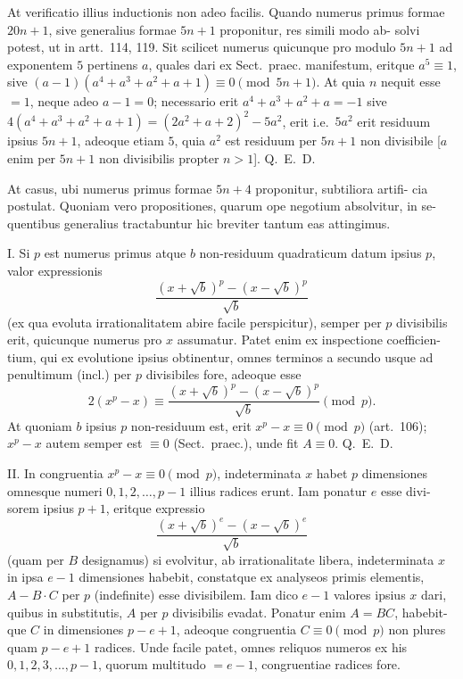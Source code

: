 \documentclass[12pt,a4paper]{article}
\begin{document}
At verificatio illius inductionis non adeo facilis. Quando numerus primus
formae $20n+1$, sive generalius formae $5n+1$ proponitur, res simili modo ab-
solvi potest, ut in artt.~114, 119. Sit scilicet numerus quicunque pro modulo
$5n+1$ ad exponentem $5$ pertinens $a$, quales dari ex Sect.~praec. manifestum,
eritque $a^5 \equiv 1$, sive $(a-1)(a^4+a^3+a^2+a+1) \equiv 0 \pmod{5n+1}$. At quia
$n$ nequit esse $=1$, neque adeo $a-1=0$; necessario erit $a^4+a^3+a^2+a = -1$
sive $4(a^4+a^3+a^2+a+1) = (2a^2+a+2)^2 - 5a^2$, erit
i.e.\ $5a^2$ erit residuum ipsius $5n+1$, adeoque etiam $5$, quia $a^2$ est residuum
per $5n+1$ non divisibile [$a$ enim per $5n+1$ non divisibilis propter $n > 1$].
Q.~E.~D.

At casus, ubi numerus primus formae $5n+4$ proponitur, subtiliora artifi-
cia postulat. Quoniam vero propositiones, quarum ope negotium absolvitur, in se-
quentibus generalius tractabuntur hic breviter tantum eas attingimus.

I. Si $p$ est numerus primus atque $b$ non-residuum quadraticum datum
ipsius $p$, valor expressionis
\[
\frac{(x+\sqrt{b})^p - (x-\sqrt{b})^p}{\sqrt{b}}
\]
(ex qua evoluta irrationalitatem abire facile perspicitur), semper per $p$ divisibilis
erit, quicunque numerus pro $x$ assumatur. Patet enim ex inspectione coefficien-
tium, qui ex evolutione ipsius obtinentur, omnes terminos a secundo usque ad
penultimum (incl.) per $p$ divisibiles fore, adeoque esse
\[
2(x^p - x) \equiv \frac{(x+\sqrt{b})^p - (x-\sqrt{b})^p}{\sqrt{b}} \pmod{p}.
\]
At quoniam $b$ ipsius $p$ non-residuum est, erit $x^p - x \equiv 0 \pmod{p}$
(art.~106); $x^p - x$ autem semper est $\equiv 0$ (Sect.~praec.), unde fit $A \equiv 0$. Q.~E.~D.

II. In congruentia $x^p - x \equiv 0 \pmod{p}$, indeterminata $x$ habet $p$ dimensiones
omnesque numeri $0, 1, 2, \ldots, p-1$ illius radices erunt. Iam ponatur $e$ esse divi-
sorem ipsius $p+1$, eritque expressio
\[
\frac{(x+\sqrt{b})^e - (x-\sqrt{b})^e}{\sqrt{b}}
\]
(quam per $B$ designamus) si evolvitur, ab irrationalitate libera, indeterminata $x$
in ipsa $e-1$ dimensiones habebit, constatque ex analyseos primis elementis,
$A - B \cdot C$ per $p$ (indefinite) esse divisibilem. Iam dico $e-1$ valores ipsius $x$ dari, quibus
in substitutis, $A$ per $p$ divisibilis evadat. Ponatur enim $A = BC$, habebit-
que $C$ in dimensiones $p-e+1$, adeoque congruentia $C \equiv 0 \pmod{p}$ non
plures quam $p-e+1$ radices. Unde facile patet, omnes reliquos numeros ex
his $0, 1, 2, 3, \ldots, p-1$, quorum multitudo $=e-1$, congruentiae radices
fore.
\end{document}
